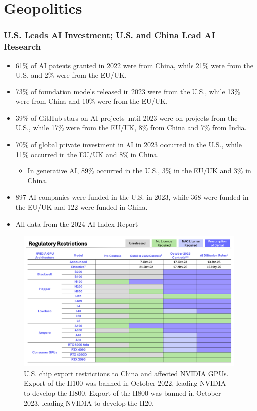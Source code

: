 \documentclass[aspectratio=169]{beamer}
\begin{document}
    \section{Geopolitics}
    \begin{frame}
        \frametitle{U.S. Leads AI Investment; U.S. and China Lead AI Research}
        \begin{itemize}
            \item 61\% of AI patents granted in 2022 were from China, while 21\% were from the U.S. and 2\% were from the EU/UK.
            \item 73\% of foundation models released in 2023 were from the U.S., while 13\% were from China and 10\% were from the EU/UK.
            \item 39\% of GitHub stars on AI projects until 2023 were on projects from the U.S., while 17\% were from the EU/UK, 8\% from China and 7\% from India.
            \item 70\% of global private investment in AI in 2023 occurred in the U.S., while 11\% occurred in the EU/UK and 8\% in China.
            \begin{itemize}
                \item In generative AI, 89\% occurred in the U.S., 3\% in the EU/UK and 3\% in China.
            \end{itemize}
            \item 897 AI companies were funded in the U.S. in 2023, while 368 were funded in the EU/UK and 122 were funded in China.
            \item All data from the 2024 AI Index Report~\parencite{stanford_university_2024}
        \end{itemize}
    \end{frame}
    \begin{frame}
        \begin{figure}
            \includegraphics[height=0.48\textwidth]{images/us-chip-export-restrictions-china}
            \caption{U.S. chip export restrictions to China and affected NVIDIA GPUs. Export of the H100 was banned in October 2022, leading NVIDIA to develop the H800. Export of the H800 was banned in October 2023, leading NVIDIA to develop the H20.~\parencite{artificial_analysis_state_2025}}
        \end{figure}
    \end{frame}
\end{document}
